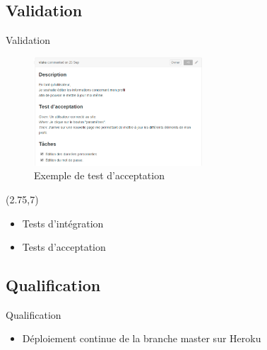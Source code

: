 \subsection{Validation}
\begin{frame}{Validation}
		\begin{figure}
			\vspace{-60px}
			\centering
			\includegraphics[width=6.3cm]{images/Process/accept-tests.png}
			\caption{\scriptsize Exemple de test d'acceptation}
			\label{fig:accept-tests}
		\end{figure}	
		\begin{minipage}{5cm}

			\begin{textblock}{6}(2.75,7)
			\begin{itemize}
				\item Tests d'intégration
				\item Tests d'acceptation
			\end{itemize}
			\end{textblock}
		\end{minipage}
\end{frame}


\subsection{Qualification}
\begin{frame}{Qualification}
	\begin{itemize}
		\item Déploiement continue de la branche master sur Heroku
	\end{itemize}
\end{frame}
